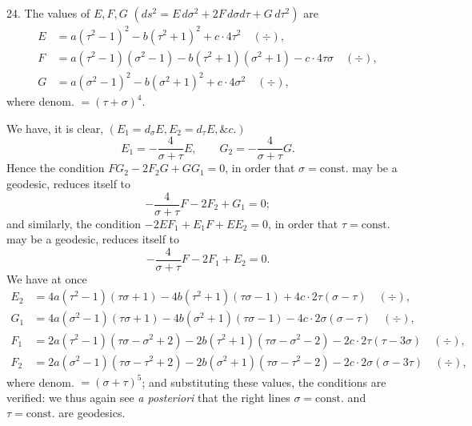 \documentclass[11pt,a4paper]{article}
\newcommand{\divmark}{\quad(\div)}
\begin{document}
24. The values of $E,F,G$ $(ds^2=E\,d\sigma^2+2F\,d\sigma d\tau+G\,d\tau^2)$ are
\[
\begin{aligned}
 E&=a(\tau^2-1)^2-b(\tau^2+1)^2+c\cdot4\tau^2\divmark,\\
 F&=a(\tau^2-1)(\sigma^2-1)-b(\tau^2+1)(\sigma^2+1)-c\cdot4\tau\sigma\divmark,\\
 G&=a(\sigma^2-1)^2-b(\sigma^2+1)^2+c\cdot4\sigma^2\divmark,
\end{aligned}
\]
where denom. $=(\tau+\sigma)^4$.

We have, it is clear, $(E_1=d_\sigma E,E_2=d_\tau E,\&c.)$
\[
 E_1=-\frac{4}{\sigma+\tau}E,\qquad G_2=-\frac{4}{\sigma+\tau}G.
\]
Hence the condition $FG_2-2F_2G+GG_1=0$, in order that $\sigma=\mathrm{const.}$ may be
a geodesic, reduces itself to
\[
 -\frac{4}{\sigma+\tau}F-2F_2+G_1=0;
\]
and similarly, the condition $-2EF_1+E_1F+EE_2=0$, in order that $\tau=\mathrm{const.}$
may be a geodesic, reduces itself to
\[
 -\frac{4}{\sigma+\tau}F-2F_1+E_2=0.
\]
We have at once
\[
\begin{aligned}
 E_2&=4a(\tau^2-1)(\tau\sigma+1)-4b(\tau^2+1)(\tau\sigma-1)
 +4c\cdot2\tau(\sigma-\tau)\divmark,\\
 G_1&=4a(\sigma^2-1)(\tau\sigma+1)-4b(\sigma^2+1)(\tau\sigma-1)
 -4c\cdot2\sigma(\sigma-\tau)\divmark,\\
 F_1&=2a(\tau^2-1)(\tau\sigma-\sigma^2+2)-2b(\tau^2+1)(\tau\sigma-\sigma^2-2)
 -2c\cdot2\tau(\tau-3\sigma)\divmark,\\
 F_2&=2a(\sigma^2-1)(\tau\sigma-\tau^2+2)-2b(\sigma^2+1)(\tau\sigma-\tau^2-2)
 -2c\cdot2\sigma(\sigma-3\tau)\divmark,
\end{aligned}
\]
where denom. $=(\sigma+\tau)^5$; and substituting these values, the conditions are verified:
we thus again see \emph{a posteriori} that the right lines $\sigma=\mathrm{const.}$ and
$\tau=\mathrm{const.}$ are geodesics.
\end{document}
